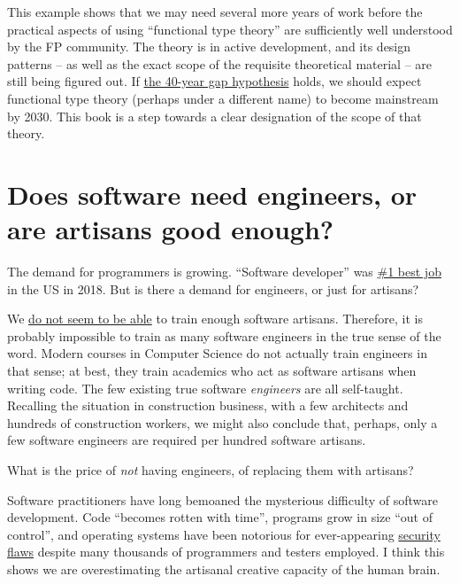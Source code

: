 This example shows that we may need several more years of work before
the practical aspects of using ``functional type theory'' are sufficiently
well understood by the FP community. The theory is in active development,
and its design patterns – as well as the exact scope of the requisite
theoretical material – are still being figured out. If \href{https://www.linkedin.com/pulse/40-year-gap-what-has-academic-computer-science-ever-done-winitzki/}{the 40-year gap hypothesis}
holds, we should expect functional type theory (perhaps under a different
name) to become mainstream by 2030. This book is a step towards a
clear designation of the scope of that theory.

\section{Does software need engineers, or are artisans good enough? }

The demand for programmers is growing. ``Software developer'' was
\href{https://money.usnews.com/money/careers/articles/how-us-news-ranks-the-best-jobs}{\#1 best job}
in the US in 2018. But is there a demand for engineers, or just for
artisans?

We \href{https://www.mendix.com/blog/5-stats-illustrating-the-developer-shortage-facing-enterprise-organizations/}{do not seem to be able}
to train enough software artisans. Therefore, it is probably impossible
to train as many software engineers in the true sense of the word.
Modern courses in Computer Science do not actually train engineers
in that sense; at best, they train academics who act as software artisans
when writing code. The few existing true software \emph{engineers}
are all self-taught. Recalling the situation in construction business,
with a few architects and hundreds of construction workers, we might
also conclude that, perhaps, only a few software engineers are required
per hundred software artisans.

What is the price of \emph{not} having engineers, of replacing them
with artisans?

Software practitioners have long bemoaned the mysterious difficulty
of software development. Code ``becomes rotten with time'', programs
grow in size ``out of control'', and operating systems have been
notorious for ever-appearing \href{https://www.techrepublic.com/article/a-malicious-usb-stick-could-crash-your-windows-pc-even-if-its-locked/}{security flaws}
despite many thousands of programmers and testers employed. I think
this shows we are overestimating the artisanal creative capacity of
the human brain.

